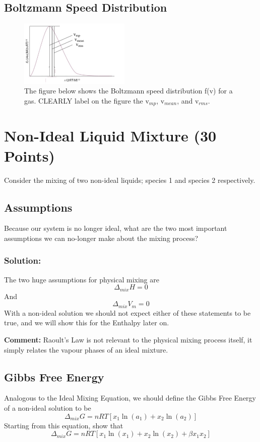\documentclass{article}
\newcommand{\be}{\begin{equation}}
\newcommand{\ee}{\end{equation}}
\begin{document}
\subsection{Boltzmann Speed Distribution}
\begin{figure}[h]
\centering
\caption{The figure below shows the Boltzmann speed distribution f(v) for a	 gas.
CLEARLY label on the figure the v$_{mp}$, v$_{mean}$, and v$_{rms}$.}
\includegraphics[width=0.47\textwidth]{midterm2_1.png}
\end{figure}

\section{Non-Ideal Liquid Mixture \qquad (30 Points)}
Consider the mixing of two non-ideal liquids; species 1 and species 2 respectively. 

\subsection{Assumptions}
Because our system is no longer ideal, what are the two most important assumptions we can no-longer make about the mixing process?

\subsubsection*{Solution:}
The two huge assumptions for physical mixing are
\be
\Delta_{mix}H = 0
\ee
And
\be
\Delta_{mix}V_m = 0
\ee
With a non-ideal solution we should not expect either of these statements to be true, and we will show this for the Enthalpy later on.

\textbf{Comment:} Raoult's Law is not relevant to the physical mixing process itself, it simply relates the vapour phases of an ideal mixture. 

\subsection{Gibbs Free Energy}
Analogous to the Ideal Mixing Equation, we should define the Gibbs Free Energy of a non-ideal solution to be 
\be
\Delta_{mix}G = nRT\left[x_1\ln(a_1) + x_2\ln(a_2)\right]
\ee
Starting from this equation, show that 
\be
\Delta_{mix}G = nRT\left[x_1\ln(x_1) + x_2\ln(x_2) + \beta x_1x_2\right]
\ee
\end{document}
